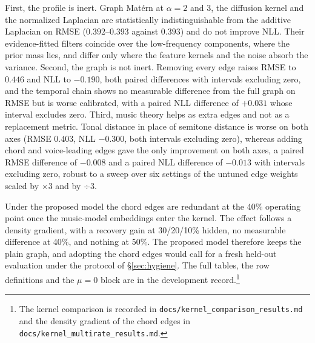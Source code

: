 First, the profile is inert. Graph Mat\'ern at $\alpha = 2$ and $3$, the
diffusion kernel and the normalized Laplacian are statistically
indistinguishable from the additive Laplacian on RMSE ($0.392$--$0.393$
against $0.393$) and do not improve NLL. Their evidence-fitted filters
coincide over the low-frequency components, where the prior mass lies, and
differ only where the feature kernels and the noise absorb the variance.
Second, the graph is not inert. Removing every edge raises RMSE to $0.446$
and NLL to $-0.190$, both paired differences with intervals excluding zero,
and the temporal chain shows no measurable difference from the full graph
on RMSE but is worse calibrated, with a paired NLL difference of $+0.031$
whose interval excludes zero. Third, music theory helps as extra edges and
not as a replacement metric. Tonal distance in place of semitone distance
is worse on both axes (RMSE $0.403$, NLL $-0.300$, both intervals excluding
zero), whereas adding chord and voice-leading edges gave the only
improvement on both axes, a paired RMSE difference of $-0.008$ and a paired
NLL difference of $-0.013$ with intervals excluding zero, robust to a sweep
over six settings of the untuned edge weights scaled by $\times 3$ and by
$\div 3$.

Under the proposed model the chord edges are redundant at the 40\%
operating point once the music-model embeddings enter the kernel. The
effect follows a density gradient, with a recovery gain at 30/20/10\%
hidden, no measurable difference at 40\%, and nothing at 50\%. The proposed
model therefore keeps the plain graph, and adopting the chord edges would
call for a fresh held-out evaluation under the protocol of
\S\ref{sec:hygiene}. The full tables, the row definitions and the $\mu = 0$
block are in the development record.\footnote{The kernel comparison is
recorded in \texttt{docs/kernel\_comparison\_results.md} and the density
gradient of the chord edges in \texttt{docs/kernel\_multirate\_results.md}.}

